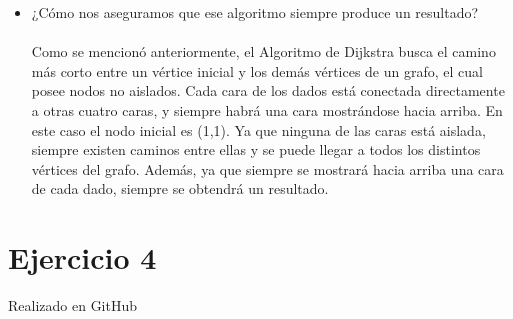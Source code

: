 \documentclass{article}
\begin{document}
\begin{itemize}
		\item{¿Cómo nos aseguramos que ese algoritmo siempre produce un resultado?}\\\\
		Como se mencionó anteriormente, el Algoritmo de Dijkstra busca el camino más corto entre un vértice inicial y los demás vértices de un grafo, el cual posee nodos no aislados. Cada cara de los dados está conectada directamente a otras cuatro caras, y siempre habrá una cara mostrándose hacia arriba. En este caso el nodo inicial es (1,1). Ya que ninguna de las caras está aislada, siempre existen caminos entre ellas y se puede llegar a todos los distintos vértices del grafo. Además, ya que siempre se mostrará hacia arriba una cara de cada dado, siempre se obtendrá un resultado.
		
	\end{itemize}
\section*{Ejercicio 4}
Realizado en GitHub
\end{document}
